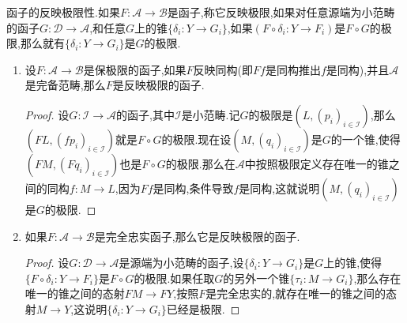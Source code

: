 函子的反映极限性.如果$F:\mathscr{A}\to\mathscr{B}$是函子,称它反映极限,如果对任意源端为小范畴的函子$G:\mathscr{D}\to\mathscr{A}$,和任意$G$上的锥$\{\delta_i:Y\to G_i\}$,如果$(F\circ\delta_i:Y\to F_i)$是$F\circ G$的极限,那么就有$\{\delta_i:Y\to G_i\}$是$G$的极限.
\begin{enumerate}
	\item 设$F:\mathscr{A}\to\mathscr{B}$是保极限的函子,如果$F$反映同构(即$Ff$是同构推出$f$是同构),并且$\mathscr{A}$是完备范畴,那么$F$是反映极限的函子.
	\begin{proof}
		
		设$G:\mathscr{I}\to\mathscr{A}$的函子,其中$\mathscr{I}$是小范畴.记$G$的极限是$(L,(p_i)_{i\in\mathscr{I}})$,那么$(FL,(fp_i)_{i\in\mathscr{I}})$就是$F\circ G$的极限.现在设$(M,(q_i)_{i\in\mathscr{I}})$是$G$的一个锥,使得$(FM,(Fq_i)_{i\in\mathscr{I}})$也是$F\circ G$的极限.那么在$\mathscr{A}$中按照极限定义存在唯一的锥之间的同构$f:M\to L$,因为$Ff$是同构,条件导致$f$是同构,这就说明$(M,(q_i)_{i\in\mathscr{I}})$是$G$的极限.
	\end{proof}
	\item 如果$F:\mathscr{A}\to\mathscr{B}$是完全忠实函子,那么它是反映极限的函子.
	\begin{proof}
		
		设$G:\mathscr{D}\to\mathscr{A}$是源端为小范畴的函子,设$\{\delta_i:Y\to G_i\}$是$G$上的锥,使得$\{F\circ\delta_i:Y\to F_i\}$是$F\circ G$的极限.如果任取$G$的另外一个锥$\{\tau_i:M\to G_i\}$,那么存在唯一的锥之间的态射$FM\to FY$,按照$F$是完全忠实的,就存在唯一的锥之间的态射$M\to Y$,这说明$\{\delta_i:Y\to G_i\}$已经是极限.
	\end{proof}
\end{enumerate}

